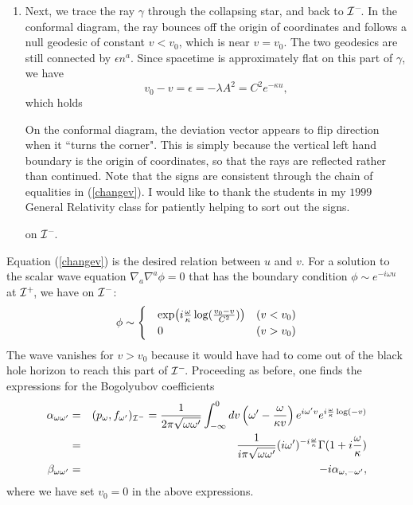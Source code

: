\documentclass[12pt]{article}
\newcommand{\be}{\begin{equation}}
\newcommand{\ee}{\end{equation}}
\newcommand{\p}{\partial}
\def\bena{\begin{eqnarray}}
\def\eena{\end{eqnarray}}
\def\finf{{\cal I}^+}
\def\pinf{{\cal I}^-}
\def\p{p_{\omega}}
\def\alp{\alpha _{\omega \omega '}}
\def\bet{\beta_{\omega\omega '}}
\begin{document}
\begin{enumerate}
\item Next, we trace the ray $\gamma$ through the collapsing star, and back
to $\pinf\!$. In the conformal diagram, the ray bounces off the origin
of coordinates and follows a null geodesic of constant $v <v_0$, which is
near $v=v_0$. The two geodesics are still connected by $\epsilon n^a$. Since
spacetime is approximately flat on this part of $\gamma$, we
have
%
\be\label{changev}v_0 -v =\epsilon =-\lambda A^2 =C^2 e^{-\kappa u} ,\ee
%
which holds\begin{footnote}{On the conformal diagram, the deviation vector
appears to flip direction when it ``turns the corner".  This is simply  because
the vertical left hand boundary is the origin of coordinates, so that the
rays are
reflected rather than continued.  Note that the signs are consistent
through the chain of equalities in (\ref{changev}).  I would like to thank the
students in my $1999$ General Relativity class for patiently helping to sort out
the signs.}\end{footnote}
on $\pinf\!$.
\end{enumerate}

Equation (\ref{changev}) is the desired relation between $u$ and $v$.
For a solution to the scalar wave equation $\nabla _a \nabla ^a \phi =0$ that
has the boundary condition $\phi\sim e^{-i\omega u}$ at $\finf\!$, we have
on $\pinf$:
%
\begin{equation}
\label{inwave}
\phi \sim \begin{cases}
\quad \exp\bigl ( {i{\omega \over\kappa}\log ({v_{\scriptsize 0} -v \over C^2})}\bigr) & (v<v_0) \\
\quad 0 & (v>v_0)\\
\end{cases}
\end{equation}
%
The wave vanishes for $v>v_0$ because it would have had to come out
of the black hole horizon to reach this part of $\pinf\!$.  Proceeding as
before, one finds
the expressions for the Bogolyubov coefficients
%
\bena\label{bhalp}\alp &=& (\p ,f_{\omega '} )_{\pinf} = {1\over
2\pi\sqrt{\omega\omega^\prime}}
\int_{-\infty}^0 dv \left(\omega ' -{\omega \over \kappa v }\right)
e^{i\omega ' v}
e ^{i {\omega \over \kappa} \log( -v  )}  \\
&= &{1\over i\pi \sqrt{\omega \omega '}}
(i\omega ' )^{-i {\omega \over \kappa}}\Gamma (1 +i {\omega \over \kappa} ) \\
\bet &=&-i\alpha _{\omega ,-\omega '},\eena
%
where we have set $v_0=0$ in the above expressions.
\end{document}
